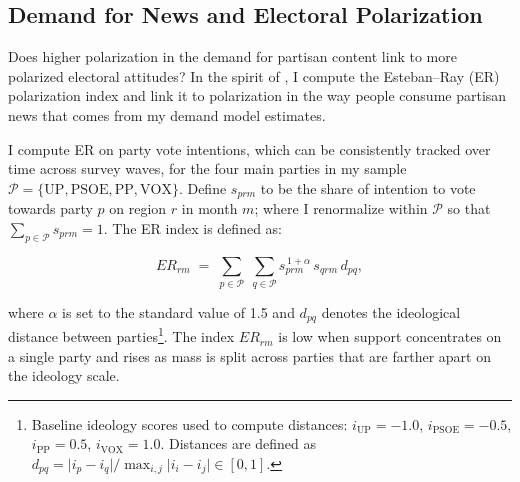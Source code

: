\documentclass[12pt]{article}
\begin{document}

\subsection{Demand for News and Electoral Polarization}




Does higher polarization in the demand for partisan content link to more polarized electoral attitudes? In the spirit of \cite{martin2017}, I 
compute the Esteban–Ray (ER) polarization index and link it to polarization in the way people consume partisan news that comes from my demand model estimates. 

I compute ER on party vote intentions, which can be consistently tracked over time across survey waves,  for the four main parties in my sample $\mathcal{P}=\{\mathrm{UP},\mathrm{PSOE},\mathrm{PP},\mathrm{VOX}\}$. Define $s_{prm}$ to be the share of intention to vote towards party $p$ on region $r$ in month $m$; where I renormalize within $\mathcal{P}$ so that $\sum_{p\in\mathcal{P}} s_{prm}=1$. The ER index is defined as: 

\begin{equation}
	ER_{rm} \;=\; 
	\displaystyle\sum_{p\in\mathcal{P}} \; \sum_{q\in\mathcal{P}} 
	s_{prm}^{\,1+\alpha}\, s_{qrm}\, d_{pq},
	\label{eq:er}
\end{equation}


where $\alpha$ is set to the standard value of 1.5 and $d_{pq}$ denotes the  ideological distance between parties\footnote{Baseline ideology scores used to compute distances: $i_{\mathrm{UP}}=-1.0$, $i_{\mathrm{PSOE}}=-0.5$, $i_{\mathrm{PP}}=0.5$, $i_{\mathrm{VOX}}=1.0$. Distances are defined as $d_{pq}=\lvert i_p-i_q\rvert/\max_{i,j}\lvert i_i-i_j\rvert \in [0,1]$.}. The index $ER_{rm}$ is low when support concentrates on a single party and rises as mass is split across parties that are farther apart on the ideology scale.
\end{document}
